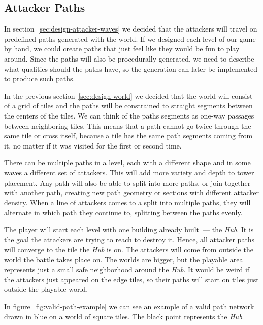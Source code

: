 \subsection{Attacker Paths}

In section~\ref{sec:design-attacker-waves} we decided that the attackers will travel on predefined paths generated with the world.
If we designed each level of our game by hand, we could create paths that just feel like they would be fun to play around.
Since the paths will also be procedurally generated, we need to describe what qualities should the paths have, so the generation can later be implemented to produce such paths.

In the previous section~\ref{sec:design-world} we decided that the world will consist of a grid of tiles and the paths will be constrained to straight segments between the centers of the tiles.
We can think of the paths segments as one-way passages between neighboring tiles.
This means that a path cannot go twice through the same tile or cross itself, because a tile has the same path segments coming from it, no matter if it was visited for the first or second time.

There can be multiple paths in a level, each with a different shape and in some waves a different set of attackers.
This will add more variety and depth to tower placement.
Any path will also be able to split into more paths, or join together with another path, creating new path geometry or sections with different attacker density.
When a line of attackers comes to a split into multiple paths, they will alternate in which path they continue to, splitting between the paths evenly.

The player will start each level with one building already built~--- the \emph{Hub}.
It is the goal the attackers are trying to reach to destroy it.
Hence, all attacker paths will converge to the tile the \emph{Hub} is on.
The attackers will come from outside the world the battle takes place on.
The worlds are bigger, but the playable area represents just a small safe neighborhood around the \emph{Hub}.
It would be weird if the attackers just appeared on the edge tiles, so their paths will start on tiles just outside the playable world.

In figure~\ref{fig:valid-path-example} we can see an example of a valid path network drawn in blue on a world of square tiles.
The black point represents the \emph{Hub}.

